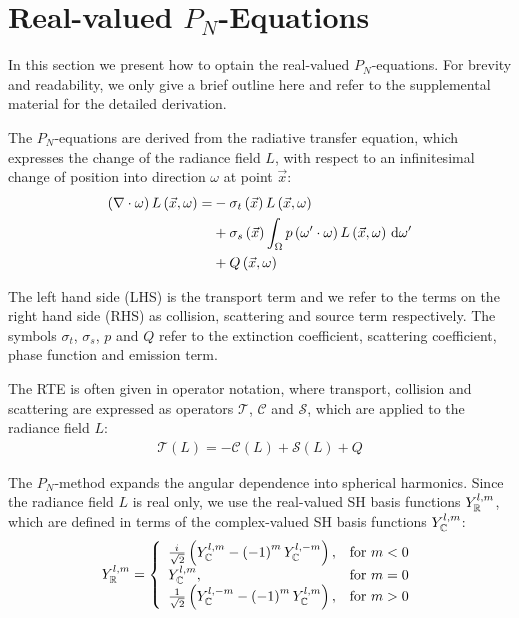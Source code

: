 \section{Real-valued $P_N$-Equations}
\label{sec:pnequations}

In this section we present how to optain the real-valued $P_N$-equations. For brevity and readability, we only give a brief outline here and refer to the supplemental material for the detailed derivation.

The $P_N$-equations are derived from the radiative transfer equation, which expresses the change of the radiance field $L$, with respect to an infinitesimal change of position into direction $\omega$ at point $\vec{x}$:
\begin{align}
\left(\nabla\cdot\omega\right)L\left(\vec{x}, \omega \right)
=&
-\sigma_t\left(\vec{x}\right) L\left(\vec{x}, \omega \right)\nonumber\\
&
+\sigma_s\left(\vec{x}\right) \int_{\Omega}
{
p\left(\omega'\cdot\omega\right)L\left(\vec{x}, \omega \right)\,\mathrm{d}\omega'
}\nonumber\\
&
+Q\left(\vec{x}, \omega\right)\nonumber
\end{align}

The left hand side (LHS) is the transport term and we refer to the terms on the right hand side (RHS) as collision, scattering and source term respectively. The symbols $\sigma_t$, $\sigma_s$, $p$ and $Q$ refer to the extinction coefficient, scattering coefficient, phase function and emission term.

The RTE is often given in operator notation, where transport, collision and scattering are expressed as operators $\mathcal{T}$, $\mathcal{C}$ and $\mathcal{S}$, which are applied to the radiance field $L$:
\begin{align}
\mathcal{T}\left(L\right) = -\mathcal{C}\left(L\right) + \mathcal{S}\left(L\right) + Q
\end{align}

The $P_N$-method expands the angular dependence into spherical harmonics. Since the radiance field $L$ is real only, we use the real-valued SH basis functions $Y_{\mathbb{R}}^{l,m}$, which are defined in terms of the complex-valued SH basis functions $Y_{\mathbb{C}}^{l,m}$:
\begin{align*}
Y_{\mathbb{R}}^{l,m}=
\left\{
\begin{array}{lr}
\frac{{i\mkern1mu}}{\sqrt{2}}\left(Y_{\mathbb{C}}^{l,m}-\left(-1\right)^mY_{\mathbb{C}}^{l,-m}\right), & \text{for } m < 0\\
Y_{\mathbb{C}}^{l,m}, & \text{for } m = 0\\
\frac{1}{\sqrt{2}}\left(Y_{\mathbb{C}}^{l,-m}-\left(-1\right)^mY_{\mathbb{C}}^{l,m}\right), & \text{for } m > 0
\end{array}
\right.
\end{align*}

